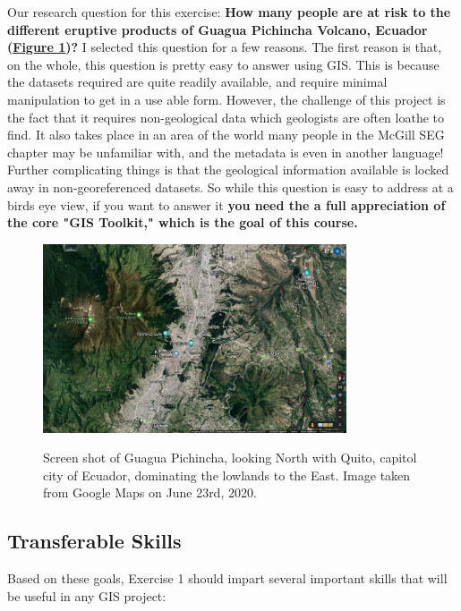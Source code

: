 \documentclass{article}
\begin{document}
Our research question for this exercise: \textbf{How many people are at risk to the different eruptive products of Guagua Pichincha Volcano, Ecuador (\href{fig:fig1}{Figure 1})?} I selected this question for a few reasons. The first reason is that, on the whole, this question is pretty easy to answer using GIS. This is because the datasets required are quite readily available, and require minimal manipulation to get in a use able form. However, the challenge of this project is the fact that it requires non-geological data which geologists are often loathe to find. It also takes place in an area of the world many people in the McGill SEG chapter may be unfamiliar with, and the metadata is even in another language! Further complicating things is that the geological information available is locked away in non-georeferenced datasets. So while this question is easy to address at a birds eye view, if you want to answer it \textbf{you need the a full appreciation of the core "GIS Toolkit," which is the goal of this course.}

\begin{figure}[htbp]
    \centering
    \includegraphics[width=0.8\textwidth]{Google Map Overview of GP and Quito.png}
    \label{fig:fig1}
    \caption{Screen shot of Guagua Pichincha, looking North with Quito, capitol city of Ecuador, dominating the lowlands to the East. Image taken from Google Maps on June 23rd, 2020. }
\end{figure}

\subsection{Transferable Skills}

Based on these goals, Exercise 1 should impart several important skills that will be useful in any GIS project:
\end{document}
